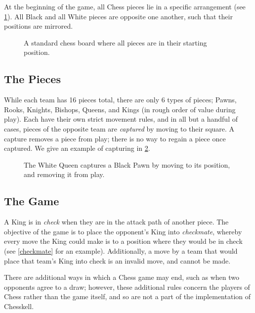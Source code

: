 At the beginning of the game, all Chess pieces lie in a specific arrangement (see \cref{startboard}). All Black and all White pieces are opposite one another, such that their positions are mirrored.

\begin{figure}[h]
    \centering
    \newgame
    \showboard
    \caption{A standard chess board where all pieces are in their starting position.}
    \label{startboard}
\end{figure}

\subsection{The Pieces}

While each team has 16 pieces total, there are only 6 types of pieces; Pawns, Rooks, Knights, Bishops, Queens, and Kings (in rough order of value during play). Each have their own strict movement rules, and in all but a handful of cases, pieces of the opposite team are \emph{captured} by moving to their square. A capture removes a piece from play; there is no way to regain a piece once captured. We give an example of capturing in \cref{capture}.

\begin{figure}[h]
    \centering
    \showboard
    \quad
    \showboard
    \caption{The White Queen captures a Black Pawn by moving to its position, and removing it from play.}
    \label{capture}
\end{figure}

\subsection{The Game}

A King is in \emph{check} when they are in the attack path of another piece. The objective of the game is to place the opponent's King into \emph{checkmate}, whereby every move the King could make is to a position where they would be in check (see \cref{checkmate} for an example). Additionally, a move by a team that would place that team's King into check is an invalid move, and cannot be made.

There are additional ways in which a Chess game may end, such as when two opponents agree to a draw; however, these additional rules concern the players of Chess rather than the game itself, and so are not a part of the implementation of Chesskell.

